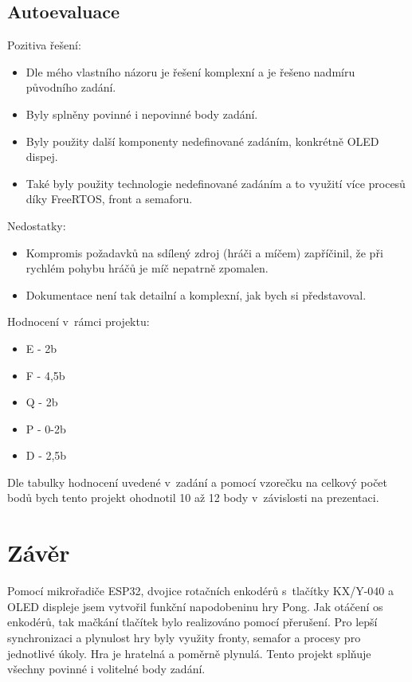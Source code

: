 \documentclass[a4paper,11pt]{article}
\begin{document}
\subsection{Autoevaluace} \noindent
Pozitiva řešení:
\begin{itemize}
    \item{Dle mého vlastního názoru je řešení komplexní a je řešeno nadmíru původního zadání.}
    \item{Byly splněny povinné i nepovinné body zadání.}
    \item{Byly použity další komponenty nedefinované zadáním, konkrétně OLED dispej.}
    \item{Také byly použity technologie nedefinované zadáním a to využití více procesů díky FreeRTOS, front a semaforu.}
\end{itemize}
\noindent
Nedostatky:
\begin{itemize}
    \item{Kompromis požadavků na sdílený zdroj (hráči a míčem) zapříčinil, že při rychlém pohybu hráčů je míč nepatrně zpomalen.}
    \item{Dokumentace není tak detailní a komplexní, jak bych si představoval.}
\end{itemize}
\noindent
Hodnocení v~rámci projektu:
\begin{itemize}
    \item{E - 2b}
    \item{F - 4,5b}
    \item{Q - 2b}
    \item{P - 0-2b}
    \item{D - 2,5b}
\end{itemize}

Dle tabulky hodnocení uvedené v~zadání a pomocí vzorečku na celkový počet bodů bych tento projekt ohodnotil 10 až 12 body v~závislosti na prezentaci.

\section{Závěr}
Pomocí mikrořadiče ESP32, dvojice rotačních enkodérů s~tlačítky KX/Y-040 a OLED displeje jsem vytvořil funkční napodobeninu hry Pong.
Jak otáčení os enkodérů, tak mačkání tlačítek bylo realizováno pomocí přerušení. 
Pro lepší synchronizaci a plynulost hry byly využity fronty, semafor a procesy pro jednotlivé úkoly.
Hra je hratelná a poměrně plynulá.
Tento projekt splňuje všechny povinné i volitelné body zadání.
\end{document}

